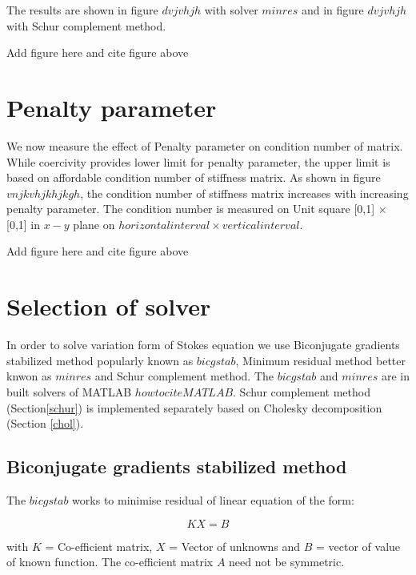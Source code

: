 \documentclass[a4paper,12pt]{book}
\begin{document}
The results are shown in figure $dvjvhjh$ with solver $minres$ and in figure $dvjvhjh$ with Schur complement method.

\begin{Huge}
Add figure here and cite figure above
\end{Huge}

\section{Penalty parameter}

We now measure the effect of Penalty parameter on condition number of matrix. While coercivity provides lower limit for penalty parameter, the upper limit is based on affordable condition number of stiffness matrix. As shown in figure $vnjkvhjkhjkgh$, the condition number of stiffness matrix increases with increasing penalty parameter.
The condition number is measured on Unit square [0,1] $\times$ [0,1] in $x-y$ plane on $horizontal interval \times vertical interval$.

\begin{Huge}
Add figure here and cite figure above
\end{Huge}

\section{Selection of solver}

In order to solve variation form of Stokes equation we use Biconjugate gradients stabilized method popularly known as $bicgstab$, Minimum residual method better knwon as $minres$ and Schur complement method. The $bicgstab$ and $minres$ are in built solvers of MATLAB $howtociteMATLAB$. Schur complement method (Section\ref{schur}) is implemented separately based on Cholesky decomposition (Section \ref{chol}).

\subsection{Biconjugate gradients stabilized method}

The $bicgstab$ works to minimise residual of linear equation of the form:

\begin{equation} \label{linear_matrix_equation}
KX = B
\end{equation}

with $K$ = Co-efficient matrix, $X$ = Vector of unknowns and $B$ = vector of value of known function. The co-efficient matrix $A$ need not be symmetric. 
\end{document}

